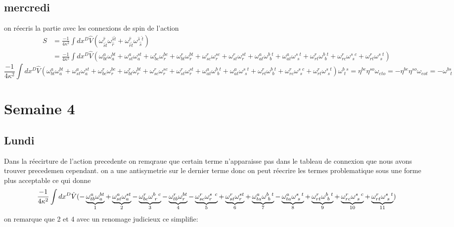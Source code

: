 \documentclass{article}
\begin{document}
\subsection{mercredi}
on réecris la partie avec les connexions de spin de l'action
\begin{align}
    S &= \frac{-1}{4 \kappa^2}\int dx^D  \hat V(\omega^{ \hat r}_{\hat s \hat t}\omega^{\hat s \hat t}_{ \hat r}+\omega^{\hat r}_{\hat r \hat t}\omega^{ \hat s\, \, \hat t}_{\, \, \hat s})\\
    & =\frac{-1}{4 \kappa^2}\int dx^D  \hat V(\omega^{a}_{bt}\omega^{bt}_a+\omega^{a}_{st}\omega^{st}_a+\omega^{r}_{bc}\omega^{bc}_r+\omega^{r}_{bt}\omega^{bt}_r+\omega^{r}_{sc}\omega^{sc}_r+\omega^{r}_{st}\omega^{st}_r+\omega^a_{at}\omega^{b\, \, t}_{\, \, b}+\omega^a_{at}\omega^{s\, \, t}_{\, \, s}+\omega^r_{rt}\omega^{b\, \, t}_{\, \, b}+\omega^r_{rc}\omega^{s\, \, c}_{\, \, s}+\omega^r_{rt}\omega^{s\, \, t}_{\, \, s})
\end{align}
\begin{equation}\frac{-1}{4 \kappa^2}\int dx^D  \hat V(\omega^{a}_{bt}\omega^{bt}_a+\omega^{a}_{st}\omega^{st}_a+\omega^{r}_{bc}\omega^{bc}_r+\omega^{r}_{bt}\omega^{bt}_r+\omega^{r}_{sc}\omega^{sc}_r+\omega^{r}_{st}\omega^{st}_r+\omega^a_{at}\omega^{b\, \, t}_{\, \, b}+\omega^a_{at}\omega^{s\, \, t}_{\, \, s}+\omega^r_{rt}\omega^{b\, \, t}_{\, \, b}+\omega^r_{rc}\omega^{s\, \, c}_{\, \, s}+\omega^r_{rt}\omega^{s\, \, t}_{\, \, s})
    \omega^{b\, \, s}_{\, \, t} = \eta^{be} \eta^{so} \omega_{eto} = -\eta^{be} \eta^{so} \omega_{e o t} =  - \omega^{b s}_{\, \, \, \, t}
\end{equation}


\section{Semaine 4}
\subsection{Lundi}
Dans la réecirture de l'action precedente on remqraue que certain terme n'apparaisse pas dans le tableau de connexion que nous avons trouver precedemen cependant. on a une antisymetrie sur le dernier terme donc on peut réecrire les termes problematique sous une forme plus acceptable ce qui donne
\begin{equation*}
    \frac{-1}{4 \kappa^2}\int dx^D  \hat V( -\underbrace{\omega^{a}_{tb}\omega^{bt}_a}_{\mathclap{1}}+\underbrace{\omega^{a}_{st}\omega^{st}_a}_{\mathclap{2}}-\underbrace{\omega^{r}_{bc}\omega^{b \, \, \, c}_{\, \,r}}_{\mathclap{3}}-\underbrace{\omega^{r}_{tb}\omega^{bt}_r}_{\mathclap{4}}-\underbrace{\omega^{r}_{sc}\omega^{s \, \, \, c}_{r}}_{\mathclap{5}}+\underbrace{\omega^{r}_{st}\omega^{st}_r}_{\mathclap{6}}+\underbrace{\omega^a_{ta}\omega^{b\, \, \, t}_{\, \, b}}_{\mathclap{7}}-\underbrace{\omega^a_{ta}\omega^{s\, \, \, t}_{\, \, s}}_{\mathclap{8}}+\underbrace{\omega^r_{rt}\omega^{b\, \, \,t}_{\, \, b}}_{\mathclap{9}}+\underbrace{\omega^r_{rc}\omega^{s\, \, \,  c}_{\, \, s}}_{\mathclap{10}}+\underbrace{\omega^r_{rt}\omega^{s\, \, \, t}_{\, \, s}}_{\mathclap{11}})
\end{equation*}
on remarque que 2 et 4 avec un renomage judicieux ce simplifie:
\end{document}
